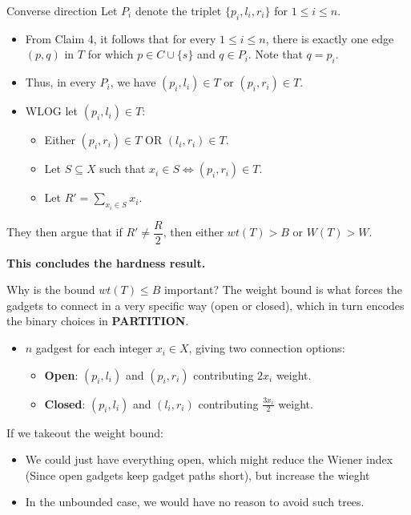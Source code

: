 \documentclass[11pt]{beamer}
\begin{document}
\begin{frame}{Converse direction}
	Let $P_i$ denote the triplet $\{p_i, l_i, r_i\}$ for $1 \leq i \leq n$.
	\begin{itemize}
		\item From Claim 4, it follows that for every $1 \leq i \leq n$, there is exactly one edge $(p, q)$ in $T$ for which $p \in C \cup \{s\}$ and $q \in P_i$. Note that $q = p_i$.
		\item Thus, in every $P_i$, we have $(p_i, l_i) \in T$ or $(p_i, r_i) \in T$.
		\item WLOG let $(p_i, l_i) \in T$:
		      \begin{itemize}
			      \item Either $(p_i, r_i) \in T$ OR $(l_i, r_i) \in T$.
			      \item Let $S \subseteq X$ such that $x_i \in S \iff (p_i, r_i) \in T$.
			      \item Let $R' = \displaystyle\sum_{x_i \in S}x_i$.
		      \end{itemize}
	\end{itemize}

	They then argue that if $R' \neq \dfrac{R}{2}$, then either $wt(T) > B$ or $W(T) > W$.

	\vspace{0.5em}

	\begin{center}
		\textbf{This concludes the hardness result.}
	\end{center}
\end{frame}

\begin{frame}{Why is the bound $wt(T) \leq B$ important?}
	The weight bound is what forces the gadgets to connect in a very specific way (open or closed), which in turn encodes the binary choices in \textbf{PARTITION}.

	\begin{itemize}
		\item $n$ gadgest for each integer $x_i \in X$, giving two connection options:
		      \begin{itemize}
			      \item \textbf{Open}: $(p_i, l_i)$ and $(p_i, r_i)$ contributing $2x_i$ weight.
			      \item \textbf{Closed}: $(p_i, l_i)$ and $(l_i, r_i)$ contributing $\frac{3x_i}{2}$ weight.
		      \end{itemize}
	\end{itemize}

	If we takeout the weight bound:
	\begin{itemize}
		\item We could just have everything open, which might reduce the Wiener index (Since open gadgets keep gadget paths short), but increase the wieght
		\item In the unbounded case, we would have no reason to avoid such trees.
	\end{itemize}
\end{frame}
\end{document}
